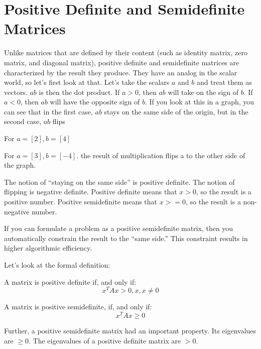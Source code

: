 \section{Positive Definite and Semidefinite Matrices}

Unlike matrices that are defined by their content (such as identity matrix, zero matrix, and diagonal matrix), positive definite and semidefinite matrices are characterized by the result they produce. They have an analog in the scalar world, so let's first look at that. Let's take the scalars $a$ and $b$ and treat them as vectors. $ab$ is then the dot product. If $a >0$, then $ab$ will take on the sign of $b$. If $a < 0$, then $ab$ will have the opposite sign of $b$. If you look at this in a graph, you can see that in the first case, $ab$ stays on the same side of the origin, but in the second case, $ab$ flips

For $a = [2], b = [4]$ 


For $a = [3], b = [-4]$. the result of multiplication flips a to the other side of the graph. 


The notion of “staying on the same side” is positive definite. The notion of flipping is negative definite. Positive definite means that $x > 0$, so the result is a positive number. Positive semidefinite means that $x >= 0$, so the result is a non-negative number. 

If you can formulate a problem as a positive semidefinite matrix, then you automatically constrain the result to the “same side.”  This constraint results in higher algorithmic efficiency.

Let's look at the formal definition:

A matrix is positive definite if, and only if:
$$x^{T}Ax > 0, x,  x \neq 0$$

A matrix is positive semidefinite, if, and only if:
$$x^{T}Ax \geq 0$$

Further, a positive semidefinite matrix had an important property. Its eigenvalues are $\geq 0$. The eigenvalues of a positive definite matrix  are $> 0$.

